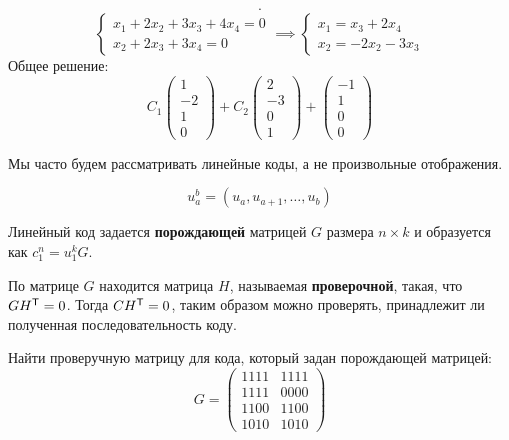 \begin{example}
\begin{align*}
        .\end{align*}
    \[\begin{cases}
        x_1 + 2x_2 + 3x_3 + 4x_4 = 0 \\
        x_2 + 2x_3 + 3x_4 = 0
    \end{cases} \implies \begin{cases}
        x_1 = x_3 + 2x_4 \\
        x_2 = -2x_2 - 3x_3
    \end{cases}\]
    Общее решение:
    \[
        C_1 \begin{pmatrix} 1 \\ -2 \\ 1 \\ 0 \end{pmatrix}
        + C_2 \begin{pmatrix} 2 \\ -3 \\ 0 \\ 1 \end{pmatrix}
        + \begin{pmatrix} -1 \\ 1 \\ 0 \\ 0 \end{pmatrix}
    \]
\end{example}

Мы часто будем рассматривать линейные коды, а не произвольные отображения.

\begin{notation}
    \[u_a^b = (u_a, u_{a + 1}, \ldots, u_b)\]
\end{notation}

Линейный код задается \textbf{порождающей} матрицей \(G\) размера \(n \times k\) и образуется как \(c_1^n = u_1^k G\).

По матрице \(G\) находится матрица \(H\), называемая \textbf{проверочной}, такая, что \(G H^{\mathsf{T}} = 0\). Тогда \(C H^{\mathsf{T}} = 0\), таким образом можно проверять, принадлежит ли полученная последовательность коду.

\begin{example}
    Найти проверучную матрицу для кода, который задан порождающей матрицей:
    \[G = \begin{pmatrix} 1111 & 1111 \\ 1111 & 0000 \\ 1100 & 1100 \\ 1010 & 1010 \end{pmatrix}\]

\end{example}

